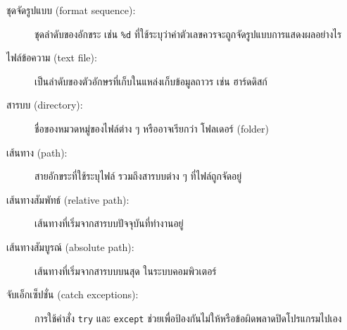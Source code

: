 \begin{description}
\item[ชุดจัดรูปแบบ (format sequence):] 
ชุดลำดับของอักขระ เช่น \texttt{\%d} ที่ใช้ระบุว่าค่าตัวเลขควรจะถูกจัดรูปแบบการแสดงผลอย่างไร


\item[ไฟล์ข้อความ (text file):] 
เป็นลำดับของตัวอักษรที่เก็บในแหล่งเก็บข้อมูลถาวร เช่น ฮาร์ดดิสก์


\item[สารบบ (directory):] ชื่อของหมวดหมู่ของไฟล์ต่าง ๆ หรืออาจเรียกว่า โฟลเดอร์ (folder)


\item[เส้นทาง (path):] สายอักขระที่ใช้ระบุไฟล์ รวมถึงสารบบต่าง ๆ ที่ไฟล์ถูกจัดอยู่


\item[เส้นทางสัมพัทธ์ (relative path):] เส้นทางที่เริ่มจากสารบบปัจจุบันที่ทำงานอยู่


\item[เส้นทางสัมบูรณ์ (absolute path):] 
เส้นทางที่เริ่มจากสารบบบนสุด ในระบบคอมพิวเตอร์


\item[จับเอ็กเซ็ปชั่น (catch exceptions):] 
การใช้คำสั่ง \texttt{try} และ \texttt{except} 
ช่วยเพื่อป้องกันไม่ให้หรือข้อผิดพลาดปิดโปรแกรมไปเอง


\end{description}
